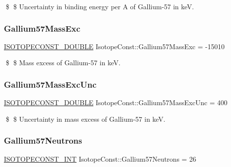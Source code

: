 \$ \$ Uncertainty in binding energy per A of Gallium-\/57 in keV. \mbox{\label{group___isotope_const-_gallium-_ga57_ga089d25f43ce305fc5fc86a5510a403d0}} 
\subsubsection{\texorpdfstring{Gallium57\+Mass\+Exc}{Gallium57MassExc}}
{\footnotesize\ttfamily \mbox{\hyperlink{group___isotope_const-_macros_ga8f45a7272ce02c0b4c65c44636ed719a}{I\+S\+O\+T\+O\+P\+E\+C\+O\+N\+S\+T\+\_\+\+D\+O\+U\+B\+LE}} Isotope\+Const\+::\+Gallium57\+Mass\+Exc = -\/15010}

\$ \$ Mass excess of Gallium-\/57 in keV. \mbox{\label{group___isotope_const-_gallium-_ga57_ga838964749f9aa96843d8612e370e9e51}} 
\subsubsection{\texorpdfstring{Gallium57\+Mass\+Exc\+Unc}{Gallium57MassExcUnc}}
{\footnotesize\ttfamily \mbox{\hyperlink{group___isotope_const-_macros_ga8f45a7272ce02c0b4c65c44636ed719a}{I\+S\+O\+T\+O\+P\+E\+C\+O\+N\+S\+T\+\_\+\+D\+O\+U\+B\+LE}} Isotope\+Const\+::\+Gallium57\+Mass\+Exc\+Unc = 400}

\$ \$ Uncertainty in mass excess of Gallium-\/57 in keV. \mbox{\label{group___isotope_const-_gallium-_ga57_ga2b8c2b142eaf0bedcc26919e1057019e}} 
\subsubsection{\texorpdfstring{Gallium57\+Neutrons}{Gallium57Neutrons}}
{\footnotesize\ttfamily \mbox{\hyperlink{group___isotope_const-_macros_ga5f18360b3e99483a35c32d789e62621c}{I\+S\+O\+T\+O\+P\+E\+C\+O\+N\+S\+T\+\_\+\+I\+NT}} Isotope\+Const\+::\+Gallium57\+Neutrons = 26}

